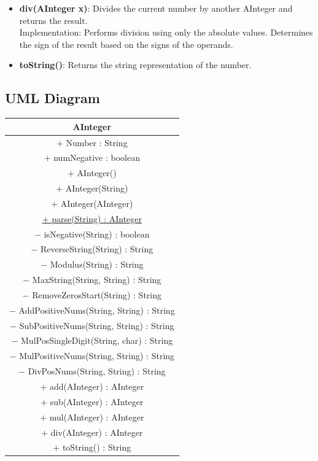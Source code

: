 \documentclass{article}
\begin{document}
\begin{itemize}
    \item \textbf{div(AInteger x)}: Divides the current number by another AInteger and returns the result. \\
    Implementation: Performs division using only the absolute values. Determines the sign of the result based on the signs of the operands.

    \item \textbf{toString()}: Returns the string representation of the number.
\end{itemize}

\subsection*{UML Diagram}
\begin{table}[H]
\centering
\begin{tabular}{|c|}
\hline
\textbf{AInteger} \\
\hline
\(+\) Number : String \\
\(+\) numNegative : boolean \\
\hline
\(+\) AInteger() \\
\(+\) AInteger(String) \\
\(+\) AInteger(AInteger) \\
\underline{+ parse(String) : AInteger} \\
\(-\) isNegative(String) : boolean \\
\(-\) ReverseString(String) : String \\
\(-\) Modulus(String) : String \\
\(-\) MaxString(String, String) : String \\
\(-\) RemoveZerosStart(String) : String \\
\(-\) AddPositiveNums(String, String) : String \\
\(-\) SubPositiveNums(String, String) : String \\
\(-\) MulPosSingleDigit(String, char) : String \\
\(-\) MulPositiveNums(String, String) : String \\
\(-\) DivPosNums(String, String) : String \\
\(+\) add(AInteger) : AInteger \\
\(+\) sub(AInteger) : AInteger \\
\(+\) mul(AInteger) : AInteger \\
\(+\) div(AInteger) : AInteger \\
\(+\) toString() : String \\
\hline
\end{tabular}
\end{table}
\end{document}
